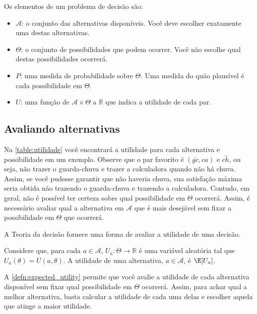 \begin{definition}
 Os elementos de um problema de decisão são:
 \begin{itemize}
  \item $\mathcal{A}$: o conjunto das
  alternativas disponíveis.
  Você deve escolher exatamente uma destas alternativas.
  \item $\Theta$: o conjunto de possibilidades que
  podem ocorrer. Você não escolhe qual
  destas possibilidades ocorrerá.
  \item $P$: uma medida de probabilidade sobre $\Theta$.
  Uma medida do quão plausível é
  cada possibilidade em $\Theta$.
  \item $U$: uma função de $\mathcal{A} \times \Theta$ a
  $\mathbb{R}$ que indica a utilidade de cada par.
 \end{itemize}
\end{definition}

\subsection{Avaliando alternativas}

Na \cref{table:utilidade} você encontrará a
utilidade para cada alternativa e possibilidade em
um exemplo. Observe que o par favorito é
$(\bar{gc},ca)$ e $\bar{ch}$, ou seja,
não trazer o guarda-chuva e trazer a calculadora quando
não há chuva.
Assim, se você pudesse garantir que não haveria chuva,
sua satisfação máxima seria obtida não trazendo o guarda-chuva e trazendo a calculadora.
Contudo, em geral, não é possível ter certeza sobre qual possibilidade em $\Theta$ ocorrerá.
Assim, é necessário avaliar qual a alternativa em $\mathcal{A}$ que é mais desejável 
sem fixar a possibilidade em $\Theta$ que ocorrerá.

A Teoria da decisão fornece uma forma de avaliar a utilidade de uma decisão.

\begin{definition}
 \label{defn:expected_utility}
 Considere que, para cada $a \in \mathcal{A}$,
 $U_{a}:\Theta \rightarrow \mathbb{R}$ é uma variável aleatória tal que
 $U_{a}(\theta) = U(a,\theta)$. A utilidade de uma alternativa, $a \in \mathcal{A}$, é $\E[U_{a}]$.
\end{definition}

A \cref{defn:expected_utility} permite que
você avalie a utilidade de cada
alternativa disponível sem fixar qual
possibilidade em $\Theta$ ocorrerá.
Assim, para achar qual a melhor alternativa,
basta calcular a utilidade de cada uma delas e escolher
aquela que atinge a maior utilidade.

